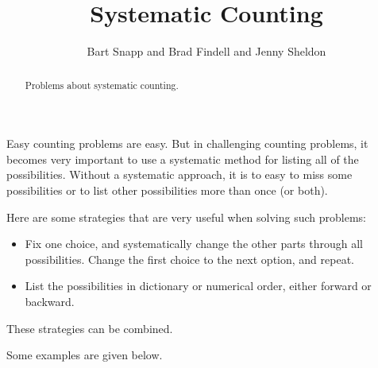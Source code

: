 \documentclass[nooutcomes]{ximera}
\title{Systematic Counting}
\author{Bart Snapp and Brad Findell and Jenny Sheldon}
\begin{document}
\begin{abstract}
Problems about systematic counting.
\end{abstract}
\maketitle


Easy counting problems are easy.  But in challenging counting problems, it becomes very important to use a systematic method for listing all of the possibilities.  Without a systematic approach, it is to easy to miss some possibilities or to    
list other possibilities more than once (or both). 

Here are some strategies that are very useful when solving such problems:  
\begin{itemize}
\item Fix one choice, and systematically change the other parts through all possibilities.  Change the first choice to the next option, and repeat.  
\item List the possibilities in dictionary or numerical order, either forward or backward. 
\end{itemize}
These strategies can be combined.  

Some examples are given below. 
\end{document}
